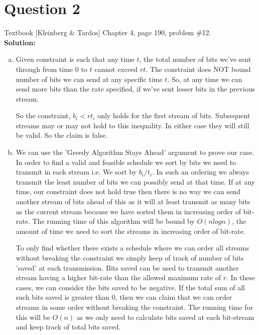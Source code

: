 \documentclass[11pt]{article}
\begin{document}
\section{Question 2} Textbook [Kleinberg \& Tardos] Chapter 4, page 190, problem \#12. \\
\textbf{Solution:} \\
\begin{enumerate}[(a)]
\item Given constraint is such that any time $ t $, the total number of bits we've sent through from time 0 to $ t $ cannot exceed $ rt $. The constraint does NOT bound number of bits we can send at any specific time $ t $. So, at any time we can send more bits than the rate specified, if we've sent lesser bits in the previous stream.

So the constraint, $ b_i < rt_i $ only holds for the first stream of bits. Subsequent streams may or may not hold to this inequality. In either case they will still be valid. So the claim is false.

\item We can use the 'Greedy Algorithm Stays Ahead' argument to prove our case. In order to find a valid and feasible schedule we sort by bits we need to transmit in each stream i.e. We sort by $ b_i/t_i $. In such an ordering we always transmit the least number of bits we can possibly send at that time. If at any time, our constraint does not hold true then there is no way we can send another stream of bits ahead of this as it will at least transmit as many bits as the current stream because we have sorted them in increasing order of bit-rate. The running time of this algorithm will be bound by $ O(nlogn) $, the amount of time we need to sort the streams in increasing order of bit-rate.

To only find whether there exists a schedule where we can order all streams without breaking the constraint we simply keep of track of number of bits 'saved' at each transmission. Bits saved can be used to transmit another stream having a higher bit-rate than the allowed maximum rate of $ r $. In these cases, we can consider the bits saved to be negative. If the total sum of all such bits saved is greater than 0, then we can claim that we can order streams in some order without breaking the constraint. The running time for this will be $ O(n) $ as we only need to calculate bits saved at each bit-stream and keep track of total bits saved.
\end{enumerate}


\clearpage
\end{document}
